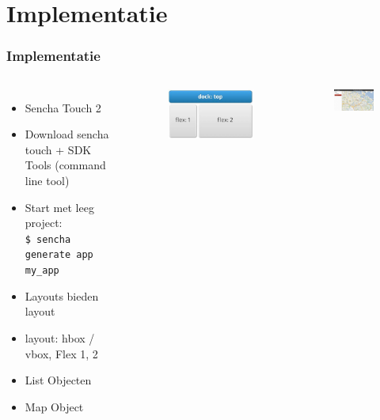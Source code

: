 \documentclass[10pt,a4paper]{beamer}
\begin{document}
\section{Implementatie}
\begin{frame}
\frametitle{Implementatie}
\begin{columns}
\column{6cm}
\begin{itemize}
\item Sencha Touch 2
\item Download sencha touch + SDK Tools (command line tool)
\item Start met leeg project: \\ \texttt{\$ sencha generate app my\_app}
\item Layouts bieden layout
\item layout: hbox / vbox, Flex 1, 2
\item List Objecten
\item Map Object
\end{itemize}
\column{4cm}
\begin{figure}
\includegraphics[scale=0.3]{docktop.png}
\end{figure}
\begin{figure}
\includegraphics[width=4cm]{ui/fsb_layout.png}
\end{figure}
\end{columns}
\end{frame}
\end{document}
